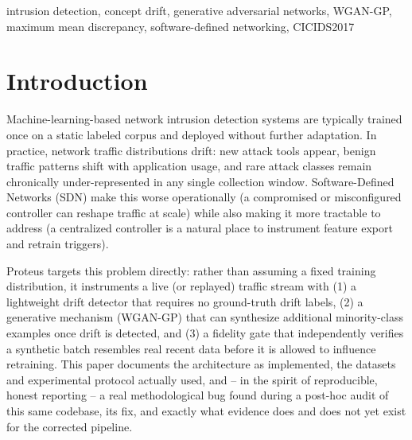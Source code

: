 \documentclass[conference]{IEEEtran}
\begin{document}
\begin{IEEEkeywords}
intrusion detection, concept drift, generative adversarial networks, WGAN-GP, maximum mean
discrepancy, software-defined networking, CICIDS2017
\end{IEEEkeywords}

\section{Introduction}

Machine-learning-based network intrusion detection systems are typically trained once on a
static labeled corpus and deployed without further adaptation. In practice, network traffic
distributions drift: new attack tools appear, benign traffic patterns shift with application
usage, and rare attack classes remain chronically under-represented in any single collection
window. Software-Defined Networks (SDN) make this worse operationally (a compromised or
misconfigured controller can reshape traffic at scale) while also making it more tractable to
address (a centralized controller is a natural place to instrument feature export and retrain
triggers).

Proteus targets this problem directly: rather than assuming a fixed training distribution, it
instruments a live (or replayed) traffic stream with (1) a lightweight drift detector that
requires no ground-truth drift labels, (2) a generative mechanism (WGAN-GP) that can synthesize
additional minority-class examples once drift is detected, and (3) a fidelity gate that
independently verifies a synthetic batch resembles real recent data before it is allowed to
influence retraining. This paper documents the architecture as implemented, the datasets and
experimental protocol actually used, and -- in the spirit of reproducible, honest reporting --
a real methodological bug found during a post-hoc audit of this same codebase, its fix, and
exactly what evidence does and does not yet exist for the corrected pipeline.
\end{document}
